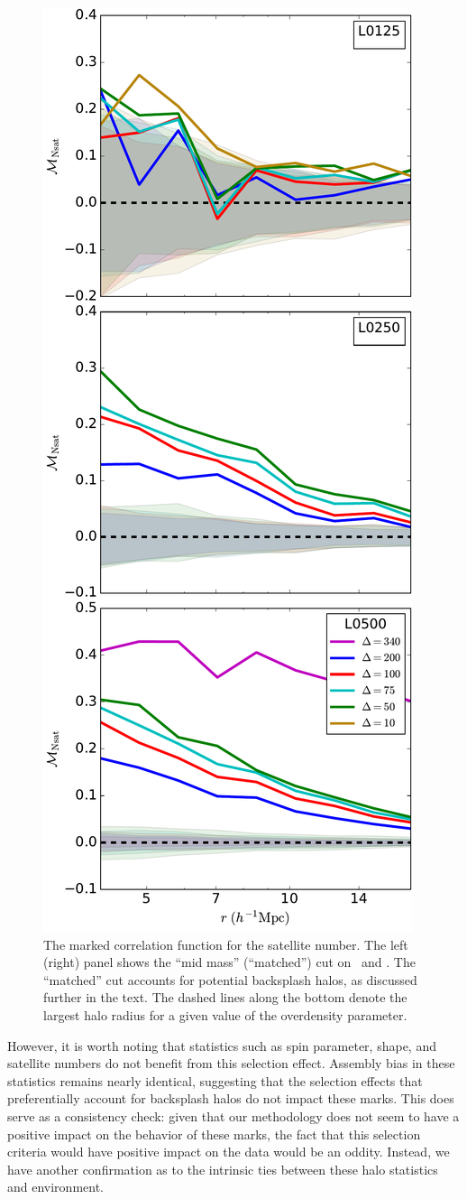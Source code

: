 \documentclass[usenatbib,usegraphicx,letterpaper]{mn2e}
\begin{document}
\begin{figure}
	\centering
	\includegraphics[width=.4\textwidth]{match_mcf_nsat.pdf}
	\caption{The marked correlation function for the satellite number. The left (right) panel shows the ``mid mass'' (``matched'') cut on \simA \ and \simB. The ``matched'' cut accounts for potential backsplash halos, as discussed further in the text. The dashed lines along the bottom denote the largest halo radius for a given value of the overdensity parameter.}
	\label{fig:hvm_mcf_nsat}
\end{figure}

However, it is worth noting that statistics such as spin parameter, shape, and satellite numbers do not benefit from this selection effect. Assembly bias in these statistics remains nearly identical, suggesting that the selection effects that preferentially account for backsplash halos do not impact these marks. This does serve as a consistency check: given that our methodology does not seem to have a positive impact on the behavior of these marks, the fact that this selection criteria would have positive impact on the data would be an oddity. Instead, we have another confirmation as to the intrinsic ties between these halo statistics and environment.
\end{document}
